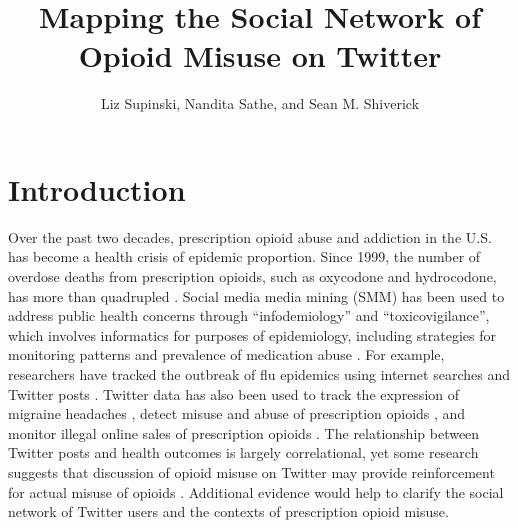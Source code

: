 \documentclass[sigconf]{acmart}
\begin{document}
\title{Mapping the Social Network of Opioid Misuse on Twitter}


\author{Liz Supinski, Nandita Sathe, and Sean M. Shiverick}

\renewcommand{\shortauthors}{Supinski, Sathe, Shiverick}




\maketitle


\section{Introduction}

Over the past two decades, prescription opioid abuse and addiction in the U.S. 
has become a health crisis of epidemic proportion. Since 1999, the number of 
overdose deaths from prescription opioids, such as oxycodone and hydrocodone, 
has more than quadrupled \cite{nida18, cdc18}. Social media media mining (SMM) 
has been used to address public health concerns through “infodemiology” and 
“toxicovigilance”, which involves informatics for purposes of epidemiology, 
including strategies for monitoring patterns and prevalence of medication abuse 
\cite{eysenbach09, sarker16}. For example, researchers have tracked the outbreak 
of flu epidemics using internet searches and Twitter posts 
\cite{culotta10, paul14, lazer14}. Twitter data has also been used to track 
the expression of migraine headaches \cite{nascimento14}, detect misuse 
and abuse of prescription opioids \cite{sarker16, chary17, dzierak17}, and 
monitor illegal online sales of prescription opioids \cite{mackey17}. 
The relationship between Twitter posts and health outcomes is largely 
correlational, yet some research suggests that discussion of opioid misuse 
on Twitter may provide reinforcement for actual misuse of opioids 
\cite{hanson13}. Additional evidence would help to clarify the social network 
of Twitter users and the contexts of prescription opioid misuse. 
\end{document}
